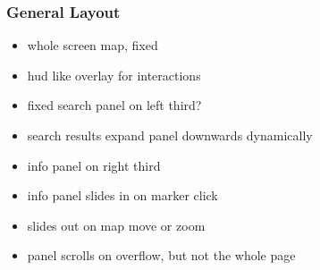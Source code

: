 \documentclass[10pt]{article}
\begin{document}
            \subsubsection{General Layout}
                \begin{itemize}
                    \item whole screen map, fixed
                    \item hud like overlay for interactions

                    \item fixed search panel on left third?
                    \item search results expand panel downwards dynamically

                    \item info panel on right third
                    \item info panel slides in on marker click
                    \item slides out on map move or zoom
                    \item panel scrolls on overflow, but not the whole page
                \end{itemize}
\end{document}
